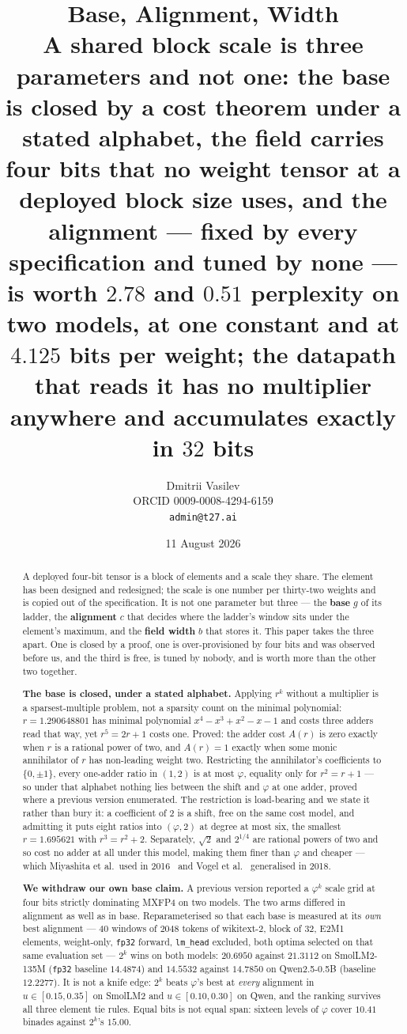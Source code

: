 \documentclass[11pt]{article}
\title{%
  \fontsize{30}{34}\selectfont\bfseries Base, Alignment, Width\\[10pt]
  \normalfont\large A shared block scale is three parameters and not one:
  the base is closed by a cost theorem under a stated alphabet, the field
  carries four bits that no weight tensor at a deployed block size uses, and
  the alignment --- fixed by every specification and tuned by none --- is worth
  $2.78$ and $0.51$ perplexity on two models, at one constant and at $4.125$
  bits per weight; the datapath that reads it has no multiplier anywhere and
  accumulates exactly in $32$ bits}
\author{Dmitrii Vasilev\\
  \small ORCID 0009-0008-4294-6159 \\
  \small \texttt{admin@t27.ai}}
\date{11 August 2026}
\theoremstyle{definition}
\begin{document}
\maketitle

\begin{abstract}
A deployed four-bit tensor is a block of elements and a scale they share. The
element has been designed and redesigned; the scale is one number per
thirty-two weights and is copied out of the specification. It is not one
parameter but three --- the \textbf{base} $g$ of its ladder, the
\textbf{alignment} $c$ that decides where the ladder's window sits under the
element's maximum, and the \textbf{field width} $b$ that stores it. This paper
takes the three apart. One is closed by a proof, one is over-provisioned by
four bits and was observed before us, and the third is free, is tuned by
nobody, and is worth more than the other two together.

\textbf{The base is closed, under a stated alphabet.} Applying $r^{k}$ without
a multiplier is a sparsest-multiple problem, not a sparsity count on the
minimal polynomial: $r = 1.290648801$ has minimal polynomial
$x^4-x^3+x^2-x-1$ and costs three adders read that way, yet $r^{5} = 2r+1$
costs one. Proved: the adder cost $A(r)$ is zero exactly when $r$ is a rational
power of two, and $A(r)=1$ exactly when some monic annihilator of $r$ has
non-leading weight two. Restricting the annihilator's coefficients to
$\{0,\pm1\}$, every one-adder ratio in $(1,2)$ is at most $\varphi$, equality
only for $r^{2}=r+1$ --- so under that alphabet nothing lies between the shift
and $\varphi$ at one adder, proved where a previous version enumerated. The
restriction is load-bearing and we state it rather than bury it: a coefficient
of $2$ is a shift, free on the same cost model, and admitting it puts eight
ratios into $(\varphi,2)$ at degree at most six, the smallest $r = 1.695621$
with $r^{3}=r^{2}+2$. Separately, $\sqrt{2}$ and $2^{1/4}$ are rational powers
of two and so cost no adder at all under this model, making them finer than
$\varphi$ and cheaper --- which Miyashita et al.\ used in
2016~\cite{miyashita} and Vogel et al.~\cite{vogel} generalised in 2018.

\textbf{We withdraw our own base claim.} A previous version reported a
$\varphi^{k}$ scale grid at four bits strictly dominating MXFP4 on two models.
The two arms differed in alignment as well as in base. Reparameterised so that
each base is measured at its \emph{own} best alignment --- 40 windows of
$2048$ tokens of wikitext-2, block of $32$, E2M1 elements, weight-only,
\texttt{fp32} forward, \texttt{lm\_head} excluded, both optima selected on that
same evaluation set --- $2^{k}$ wins on both models: $20.6950$ against
$21.3112$ on SmolLM2-135M (\texttt{fp32} baseline $14.4874$) and $14.5532$
against $14.7850$ on Qwen2.5-0.5B (baseline $12.2277$). It is not a knife edge:
$2^{k}$ beats $\varphi$'s best at \emph{every} alignment in $u\in[0.15,0.35]$
on SmolLM2 and $u\in[0.10,0.30]$ on Qwen, and the ranking survives all three
element tie rules. Equal bits is not equal span: sixteen levels of $\varphi$
cover $10.41$ binades against $2^{k}$'s $15.00$.


\end{abstract}
\end{document}
